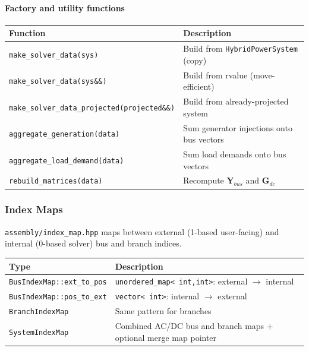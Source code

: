 \paragraph{Factory and utility functions}
\begin{center}
\begin{tabular}{ll}
\hline\hline
\textbf{Function} & \textbf{Description} \\
\hline
\texttt{make\_solver\_data(sys)} & Build from \texttt{HybridPowerSystem} (copy) \\
\texttt{make\_solver\_data(sys\&\&)} & Build from rvalue (move-efficient) \\
\texttt{make\_solver\_data\_projected(projected\&\&)} & Build from already-projected system \\
\texttt{aggregate\_generation(data)} & Sum generator injections onto bus vectors \\
\texttt{aggregate\_load\_demand(data)} & Sum load demands onto bus vectors \\
\texttt{rebuild\_matrices(data)} & Recompute \(\mathbf{Y}_{bus}\) and \(\mathbf{G}_{dc}\) \\
\hline\hline
\end{tabular}
\end{center}

\subsubsection{Index Maps}
\label{sec:index-map}

\texttt{assembly/index\_map.hpp} maps between external (1-based user-facing)
and internal (0-based solver) bus and branch indices.

\begin{center}
\begin{tabular}{ll}
\hline\hline
\textbf{Type} & \textbf{Description} \\
\hline
\texttt{BusIndexMap::ext\_to\_pos} & \texttt{unordered\_map< int,int>}: external $\to$ internal \\
\texttt{BusIndexMap::pos\_to\_ext} & \texttt{vector< int>}: internal $\to$ external \\
\texttt{BranchIndexMap} & Same pattern for branches \\
\texttt{SystemIndexMap} & Combined AC/DC bus and branch maps + optional merge map pointer \\
\hline\hline
\end{tabular}
\end{center}

